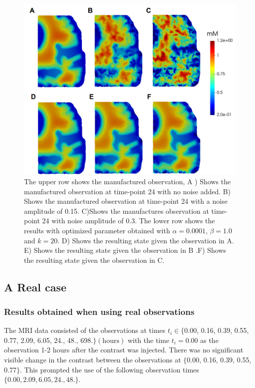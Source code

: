\documentclass[12pt,a4paper]{article}
\begin{document}
\begin{figure}
\centering
\includegraphics[scale=0.4]{noise-24.png}
\caption{The upper row shows the manufactured observation, A ) Shows the manufactured observation at time-point 24 with no noise added. B) Shows the manufactured observation at time-point 24 with a noise amplitude of 0.15. C)Shows the manufactures observation at time-point 24 with noise amplitude of 0.3. The lower row shows the results with optimized parameter obtained with $\alpha=0.0001$, $\beta=1.0$ and $k=20$. D) Shows the resulting state given the observation in A. E)  Shows the resulting state given the observation in B .F) Shows the resulting state given the observation in C.  }
\label{24hourswithnoise}
\end{figure}

\subsection{A Real case} 

\subsubsection{Results obtained when using real observations}
The MRI data consisted of the observations at times $t_i \in \lbrace$0.00, 0.16, 0.39, 0.55, 0.77, 2.09, 6.05, 24., 48., 698.$\rbrace \mathrm{(hours)}$ with the time $t_i=0.00$ as the observation 1-2 hours after the contrast was injected. There was no significant visible change in the contrast between the observations at $\lbrace$0.00, 0.16, 0.39, 0.55, 0.77$\rbrace$. This prompted the use of the following observation times  $\lbrace0.00, 2.09, 6.05, 24., 48.\rbrace$. 
\end{document}
